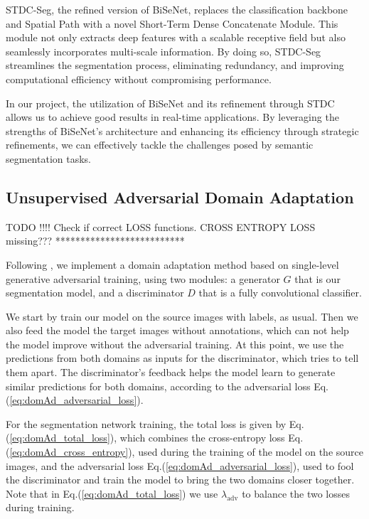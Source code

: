 \documentclass[10pt,twocolumn,letterpaper]{article}
\begin{document}
STDC-Seg, the refined version of BiSeNet, replaces the classification backbone and Spatial Path with a novel Short-Term Dense Concatenate Module. This module not only extracts deep features with a scalable receptive field but also seamlessly incorporates multi-scale information. By doing so, STDC-Seg streamlines the segmentation process, eliminating redundancy, and improving computational efficiency without compromising performance.

In our project, the utilization of BiSeNet and its refinement through STDC allows us to achieve good results in real-time applications. By leveraging the strengths of BiSeNet's architecture and enhancing its efficiency through strategic refinements, we can effectively tackle the challenges posed by semantic segmentation tasks.




\subsection{Unsupervised Adversarial Domain Adaptation}

TODO !!!! Check if correct LOSS functions. CROSS ENTROPY LOSS missing??? **************************

Following \cite{DomAd}, we implement a domain adaptation method based on single-level generative adversarial training, using two modules: a generator $G$ that is our segmentation model, and a discriminator $D$ that is a fully convolutional classifier.

We start by train our model on the source images with labels, as usual. Then we also feed the model the target images without annotations, which can not help the model improve without the adversarial training. At this point, we use the predictions from both domains as inputs for the discriminator, which tries to tell them apart. The discriminator’s feedback helps the model learn to generate similar predictions for both domains, according to the adversarial loss Eq.(\ref{eq:domAd_adversarial_loss}).

For the segmentation network training, the total loss is given by Eq.(\ref{eq:domAd_total_loss}), which combines the cross-entropy loss Eq.(\ref{eq:domAd_cross_entropy}), used during the training of the model on the source images, and the adversarial loss Eq.(\ref{eq:domAd_adversarial_loss}), used to fool the discriminator and train the model to bring the two domains closer together.
Note that in Eq.(\ref{eq:domAd_total_loss}) we use $\lambda_{\text{adv}}$ to balance the two losses during training.\\
\end{document}

